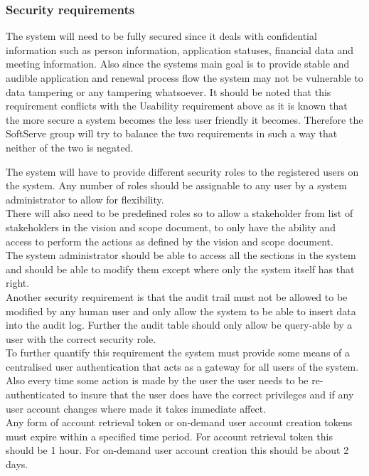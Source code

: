 \subsubsection{Security requirements}

\begin{flushleft}

The system will need to be fully secured since it deals with confidential information such as person information, application statuses, financial data and meeting information. Also since the systems main goal is to provide stable and audible application and renewal process flow the system may not be vulnerable to data tampering or any tampering whatsoever. It should be noted that this requirement conflicts with the Usability requirement above as it is known that the more secure a system becomes the less user friendly it becomes. Therefore the SoftServe group will try to balance the two requirements in such a way that neither of the two is negated.\\
\vspace{0.1in}

The system will have to provide different security roles to the registered users on the system. Any number of roles should be assignable to any user by a system administrator to allow for flexibility.\\
There will also need to be predefined roles so to allow a stakeholder from list of stakeholders in the vision and scope document, to only have the ability and access to perform the actions as defined by the vision and scope document.\\
The system administrator should be able to access all the sections in the system and should be able to modify them except where only the system itself has that right.\\
Another security requirement is that the audit trail must not be allowed to be modified by any human user and only allow the system to be able to insert data into the audit log. Further the audit table should only allow be query-able by a user with the correct security role.\\
To further quantify this requirement the system must provide some means of a centralised user authentication that acts as a gateway for all users of the system. Also every time some action is made by the user the user needs to be re-authenticated to insure that the user does have the correct privileges and if any user account changes where made it takes immediate affect. \\
Any form of account retrieval token or on-demand user account creation tokens must expire within a specified time period. For account retrieval token this should be 1 hour. For on-demand user account creation this should be about 2 days.

\end{flushleft}

